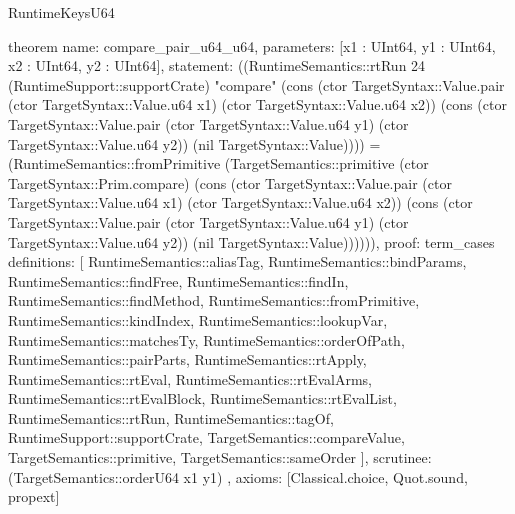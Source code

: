 \begin{lexlean}{RuntimeKeysU64}
\begin{semanticmodule}
theorem{
  name: compare_pair_u64_u64,
  parameters: [x1 : UInt64, y1 : UInt64, x2 : UInt64, y2 : UInt64],
  statement: ((RuntimeSemantics::rtRun 24 (RuntimeSupport::supportCrate) "compare" (cons (ctor TargetSyntax::Value.pair (ctor TargetSyntax::Value.u64 x1) (ctor TargetSyntax::Value.u64 x2)) (cons (ctor TargetSyntax::Value.pair (ctor TargetSyntax::Value.u64 y1) (ctor TargetSyntax::Value.u64 y2)) (nil TargetSyntax::Value)))) = (RuntimeSemantics::fromPrimitive (TargetSemantics::primitive (ctor TargetSyntax::Prim.compare) (cons (ctor TargetSyntax::Value.pair (ctor TargetSyntax::Value.u64 x1) (ctor TargetSyntax::Value.u64 x2)) (cons (ctor TargetSyntax::Value.pair (ctor TargetSyntax::Value.u64 y1) (ctor TargetSyntax::Value.u64 y2)) (nil TargetSyntax::Value)))))),
  proof: term_cases{
    definitions: [
      RuntimeSemantics::aliasTag,
      RuntimeSemantics::bindParams,
      RuntimeSemantics::findFree,
      RuntimeSemantics::findIn,
      RuntimeSemantics::findMethod,
      RuntimeSemantics::fromPrimitive,
      RuntimeSemantics::kindIndex,
      RuntimeSemantics::lookupVar,
      RuntimeSemantics::matchesTy,
      RuntimeSemantics::orderOfPath,
      RuntimeSemantics::pairParts,
      RuntimeSemantics::rtApply,
      RuntimeSemantics::rtEval,
      RuntimeSemantics::rtEvalArms,
      RuntimeSemantics::rtEvalBlock,
      RuntimeSemantics::rtEvalList,
      RuntimeSemantics::rtRun,
      RuntimeSemantics::tagOf,
      RuntimeSupport::supportCrate,
      TargetSemantics::compareValue,
      TargetSemantics::primitive,
      TargetSemantics::sameOrder
    ],
    scrutinee: (TargetSemantics::orderU64 x1 y1)
  },
  axioms: [Classical.choice, Quot.sound, propext]
}


\end{semanticmodule}
\end{lexlean}
